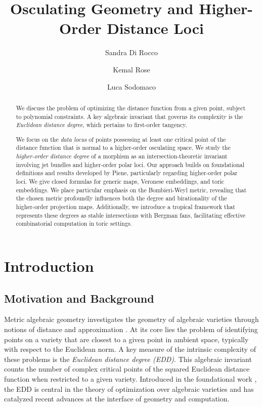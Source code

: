 \documentclass[11pt,reqno]{amsart}
\title[Osculating Geometry and Higher-Order Distance Loci]{Osculating Geometry and Higher-Order Distance Loci}
\author{Sandra Di Rocco}
\author{Kemal Rose}
\author{Luca Sodomaco}
\numberwithin{equation}{section}
\theoremstyle{plain}
\numberwithin{theorem}{section}
\theoremstyle{definition}
\begin{document}
\begin{abstract}
We discuss the problem of optimizing the distance function from a given point, subject to polynomial constraints. A key algebraic invariant that governs its complexity is the {\em Euclidean distance degree}, which pertains to first-order tangency.

We focus on the {\em data locus} of points possessing at least one critical point of the distance function that is normal to a higher-order osculating space. We study the {\em higher-order distance degree} of a morphism as an intersection-theoretic invariant involving jet bundles and higher-order polar loci. Our approach builds on foundational definitions and results developed by Piene, particularly regarding higher-order polar loci. We give closed formulas for generic maps, Veronese embeddings, and toric embeddings. We place particular emphasis on the Bombieri-Weyl metric, revealing that the chosen metric profoundly influences both the degree and birationality of the higher-order projection maps. Additionally, we introduce a tropical framework that represents these degrees as stable intersections with Bergman fans, facilitating effective combinatorial computation in toric settings.
\end{abstract}

\maketitle

{
\hypersetup{linkcolor=black}
\tableofcontents
}



\section{Introduction}


\subsection*{Motivation and Background}
Metric algebraic geometry investigates the geometry of algebraic varieties through notions of distance and approximation \cite{breiding2024metric}. At its core lies the problem of identifying points on a variety that are closest to a given point in ambient space, typically with respect to the Euclidean norm.
A key measure of the intrinsic complexity of these problems is the {\em Euclidean distance degree (EDD)}. This algebraic invariant counts the number of complex critical points of the squared Euclidean distance function when restricted to a given variety. Introduced in the foundational work \cite{DHOST}, the EDD is central in the theory of optimization over algebraic varieties and has catalyzed recent advances at the interface of geometry and computation.
\end{document}
